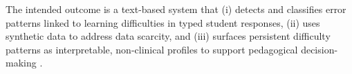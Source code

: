 The intended outcome is a text-based system that (i) detects and classifies error patterns linked to learning difficulties in typed student responses, (ii) uses synthetic data to address data scarcity, and (iii) surfaces persistent difficulty patterns as interpretable, non-clinical profiles to support pedagogical decision-making \parencite{Bryant2023GECsurvey,RomeroVentura2024}.
